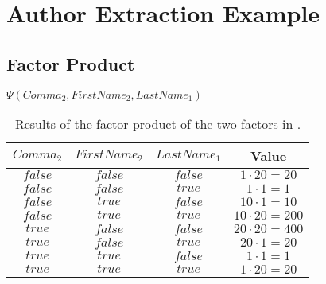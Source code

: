 \chapter{Author Extraction Example}\label{app:cha-author-extraction-example}
\section{Factor Product}\label{app:sec-factor-product}
\begin{table}[h!]
\centering
$\Psi(Comma_2,FirstName_2,LastName_1)$\par
\smallskip
\begin{tabular}{c c c c}
 \toprule
 $Comma_2$ & $FirstName_2$ & $LastName_1$ & Value \\
 \midrule
 $false$ & $false$ & $false$ & $1\cdot20=20$ \\
 $false$ & $false$ & $true$  & $1\cdot1=1$ \\
 $false$ & $true$  & $false$ & $10\cdot1=10$ \\
 $false$ & $true$  & $true$  & $10\cdot20=200$ \\
 $true$  & $false$ & $false$ & $20\cdot20=400$ \\
 $true$  & $false$ & $true$  & $20\cdot1=20$ \\
 $true$  & $true$  & $false$ & $1\cdot1=1$ \\
 $true$  & $true$  & $true$  & $1\cdot20=20$ \\
 \bottomrule
\end{tabular}
\caption{Results of the \gls{factor product} of the two \glspl{factor} in .}
\label{tab:example-factor-product}
\end{table}
